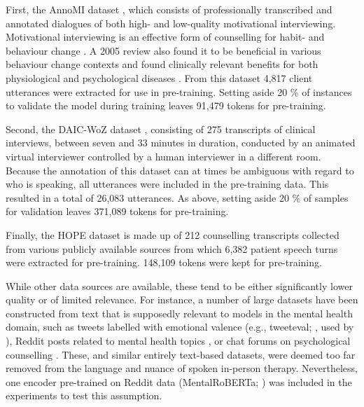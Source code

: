 \documentclass[12pt]{report}
\begin{document}
First, the AnnoMI dataset \cite{Wu2022}, which consists of professionally transcribed and annotated dialogues of both high- and low-quality motivational interviewing.
Motivational interviewing is an effective form of counselling for habit- and behaviour change \cite{Apodaca2014, Gillam2019}.
A 2005 review also found it to be beneficial in various behaviour change contexts and found clinically relevant benefits for both physiological and psychological diseases \cite{Rubak2005}.
From this dataset 4,817 client utterances were extracted for use in pre-training.
Setting aside 20 \% of instances to validate the model during training leaves 91,479 tokens for pre-training.

Second, the DAIC-WoZ dataset \cite{Gratch2014}, consisting of 275 transcripts of clinical interviews, between seven and 33 minutes in duration, conducted by an animated virtual interviewer controlled by a human interviewer in a different room.
Because the annotation of this dataset can at times be ambiguous with regard to who is speaking, all utterances were included in the pre-training data.
This resulted in a total of 26,083 utterances. As above, setting aside 20 \% of samples for validation leaves 371,089 tokens for pre-training.

Finally, the HOPE dataset \cite{Malhotra2022} is made up of 212 counselling transcripts collected from various publicly available sources from which 6,382 patient speech turns were extracted for pre-training.
148,109 tokens were kept for pre-training.

While other data sources are available, these tend to be either significantly lower quality or of limited relevance.
For instance, a number of large datasets have been constructed from text that is supposedly relevant to models in the mental health domain, such as tweets labelled with emotional valence (e.g., tweeteval; , used by ), Reddit posts related to mental health topics \cite{Kim2020, MentalBERT}, or chat forums on psychological counselling \cite{counselchat}.
These, and similar entirely text-based datasets, were deemed too far removed from the language and nuance of spoken in-person therapy.
Nevertheless, one encoder pre-trained on Reddit data (MentalRoBERTa; ) was included in the experiments to test this assumption.
\end{document}
